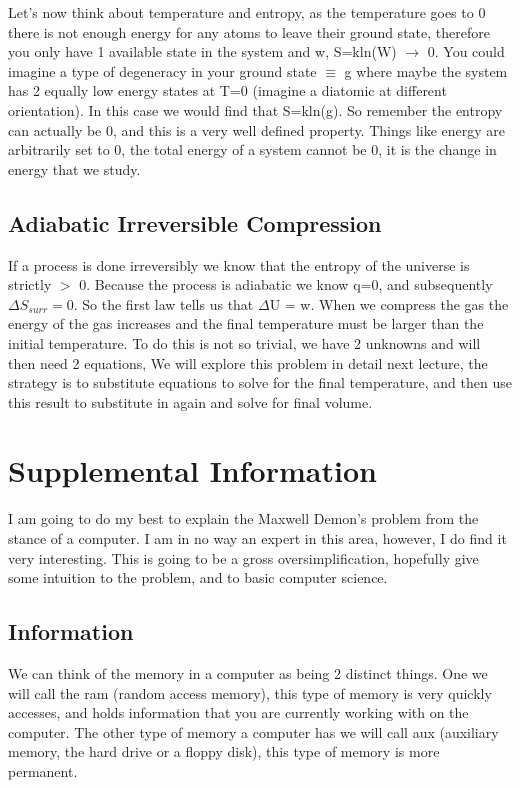 \documentclass{article}
\begin{document}
Let's now think about temperature and entropy, as the temperature goes to 0 there is not enough energy for any atoms to leave their ground state, therefore you only have 1 available state in the system and w, S=kln(W) $\rightarrow$ 0. 
You could imagine a type of degeneracy in your ground state $\equiv$ g where maybe the system has 2 equally low energy states at T=0 (imagine a diatomic at different orientation). 
In this case we would find that S=kln(g). 
So remember the entropy can actually be 0, and this is a very well defined property.
Things like energy are arbitrarily set to 0, the total energy of a system cannot be 0, it is the change in energy that we study. 

\subsection*{Adiabatic Irreversible Compression}
If a process is done irreversibly we know that the entropy of the universe is strictly $>$ 0. 
Because the process is adiabatic we know q=0, and subsequently $\Delta S_{surr} = 0$. 
So the first law tells us that $\Delta$U = w. 
When we compress the gas the energy of the gas increases and the final temperature must be larger than the initial temperature. 
To do this is not so trivial, we have 2 unknowns and will then need 2 equations,
We will explore this problem in detail next lecture, the strategy is to substitute equations to solve for the final temperature, and then use this result to substitute in again and solve for final volume. 

\section{Supplemental Information}
I am going to do my best to explain the Maxwell Demon's problem from the stance of a computer. 
I am in no way an expert in this area, however, I do find it very interesting. 
This is going to be a gross oversimplification, hopefully give some intuition to the problem, and to basic computer science.

\subsection{Information}
We can think of the memory in a computer as being 2 distinct things.
One we will call the ram (random access memory), this type of memory is very quickly accesses, and holds information that you are currently working with on the computer. 
The other type of memory a computer has we will call aux (auxiliary memory, the hard drive or a floppy disk), this type of memory is more permanent. 
\end{document}
